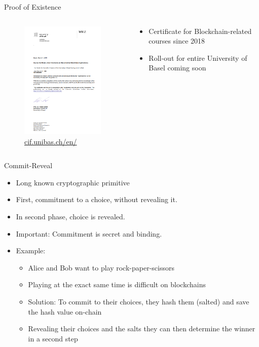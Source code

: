 \documentclass[handout]{beamer}
\begin{document}

\begin{frame}{Proof of Existence}
	\begin{columns}
		\begin{column}{0.4\textwidth}
			\begin{figure}
				\centering
				\includegraphics[width=4cm, frame]{../assets/images/Diploma_unibas.PNG}
				\scriptsize{\href{https://cif.unibas.ch/en/events-projects/certificates/}{cif.unibas.ch/en/}}
			\end{figure}
		\end{column}
		\begin{column}{0.6\textwidth}
			\begin{itemize}
				\item<1 -> Certificate for Blockchain-related courses since 2018 
				\item<2 -> Roll-out for entire University of Basel coming soon
			\end{itemize}
		\end{column}
	\end{columns}
\end{frame}


\begin{frame}{Commit-Reveal}
	\begin{itemize}
		\item<1 -> Long known cryptographic primitive
		\item<2 -> First, commitment to a choice, without revealing it.
		\item<3 -> In second phase, choice is revealed.
		\item<4 -> Important: Commitment is secret and binding.\vspace{0.5cm}
		\item<5 -> Example:
		\begin{itemize}
			\item<5 -> Alice and Bob want to play rock-paper-scissors
			\item<6 -> Playing at the exact same time is difficult on blockchains
			\item<7 -> Solution: To commit to their choices, they hash them (salted) and save the hash value on-chain
			\item<8 -> Revealing their choices and the salts they can then determine the winner in a second step
		\end{itemize}
	\end{itemize}
\end{frame}
\end{document}
